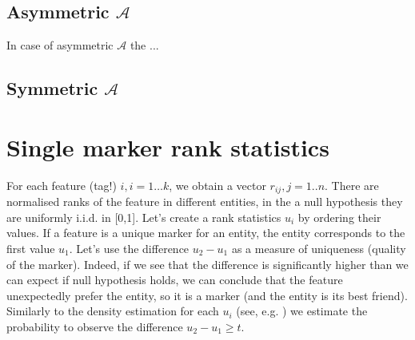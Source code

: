\documentclass{llncs}
\begin{document}








\subsection{Asymmetric $\mathcal{A}$}

In case of asymmetric $\mathcal{A}$ the ...

\subsection{Symmetric $\mathcal{A}$}
 

\section{Single marker rank statistics}




For each feature (tag!) $i,i=1\dots k$, we obtain a vector $r_{ij}, j=1..n$. There are normalised ranks of the feature in different entities, in the a null hypothesis they are uniformly i.i.d. in [0,1]. Let's create a rank statistics $u_i$ by ordering their values. If a feature is a unique marker for an entity, the entity corresponds to the first  value $u_1$. Let's use the difference $u_2-u_1$ as a measure of uniqueness (quality of the marker). Indeed, if we see that the difference is significantly higher than we can expect if null hypothesis holds, we can conclude that the feature unexpectedly prefer the entity, so it is a marker (and the entity is its best friend). Similarly to the density estimation for each $u_i$ (see, e.g. \cite{Gut:2009}) we estimate the probability to observe the difference $u_2 - u_1 \ge t$. 
\end{document}
